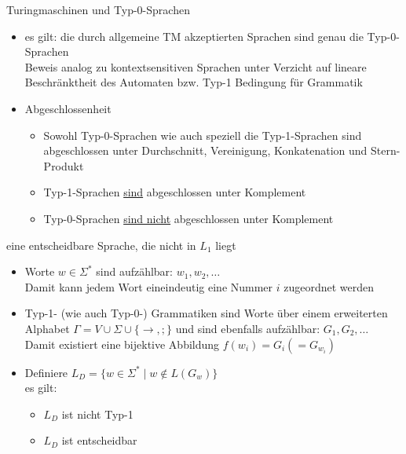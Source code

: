 \begin{frame}{Turingmaschinen und Typ-0-Sprachen}
	\begin{itemize}
		\item es gilt: die durch allgemeine TM akzeptierten Sprachen sind genau die Typ-0-Sprachen\\
		Beweis analog zu kontextsensitiven Sprachen unter Verzicht auf lineare Beschränktheit des Automaten bzw. Typ-1 Bedingung für Grammatik
		\item Abgeschlossenheit
		\begin{itemize}
			\item Sowohl Typ-0-Sprachen wie auch speziell die Typ-1-Sprachen sind abgeschlossen unter Durchschnitt, Vereinigung, Konkatenation und Stern-Produkt
			\item Typ-1-Sprachen \underline{sind} abgeschlossen unter Komplement
			\item Typ-0-Sprachen \underline{sind nicht} abgeschlossen unter Komplement
		\end{itemize}
	\end{itemize}
\end{frame}

\begin{frame}{eine entscheidbare Sprache, die nicht in $L_1$ liegt}
	\begin{itemize}
		\item Worte $w \in \Sigma^*$ sind aufzählbar: $w_1, w_2, \ldots$\\
		Damit kann jedem Wort eineindeutig eine Nummer $i$ zugeordnet werden
		\item Typ-1- (wie auch Typ-0-) Grammatiken sind Worte über einem erweiterten Alphabet $\Gamma = V \cup \Sigma \cup \{\rightarrow, ;\}$ und sind ebenfalls aufzählbar: $G_1, G_2, \ldots$\\
		Damit existiert eine bijektive Abbildung $f(w_i) = G_i (= G_{w_i})$
		\item Definiere $L_D=\{w \in \Sigma^* \mid w \notin L(G_w)\}$\\
		es gilt:
		\begin{itemize}
			\item $L_D$ ist nicht Typ-1
			\item $L_D$ ist entscheidbar
		\end{itemize}
	\end{itemize}
\end{frame}

